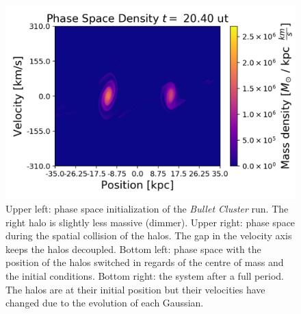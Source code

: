 \begin{figure}[h!]
    \includegraphics[scale=0.45]{imag/bullet51.png}
    \caption{Upper left: phase space initialization of the \emph{Bullet Cluster} run. The right halo is slightly less massive (dimmer). Upper right: phase space during the spatial collision of the halos. The gap in the velocity axis keeps the halos decoupled. Bottom left: phase space with the position of the halos switched in regards of the centre of mass and the initial conditions. Bottom right: the system after a full period. The halos are at their initial position but their velocities have changed due to the evolution of each Gaussian.}
    \label{phaseNoColBullet}
\end{figure}

